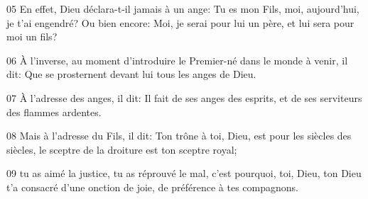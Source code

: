 
05 En effet, Dieu déclara-t-il jamais à un ange: Tu es mon Fils, moi, aujourd’hui, je t’ai engendré? Ou bien encore: Moi, je serai pour lui un père, et lui sera pour moi un fils?

06 À l’inverse, au moment d’introduire le Premier-né dans le monde à venir, il dit: Que se prosternent devant lui tous les anges de Dieu.

07 À l’adresse des anges, il dit: Il fait de ses anges des esprits, et de ses serviteurs des flammes ardentes.

08 Mais à l’adresse du Fils, il dit: Ton trône à toi, Dieu, est pour les siècles des siècles, le sceptre de la droiture est ton sceptre royal;

09 tu as aimé la justice, tu as réprouvé le mal, c’est pourquoi, toi, Dieu, ton Dieu t’a consacré d’une onction de joie, de préférence à tes compagnons.

